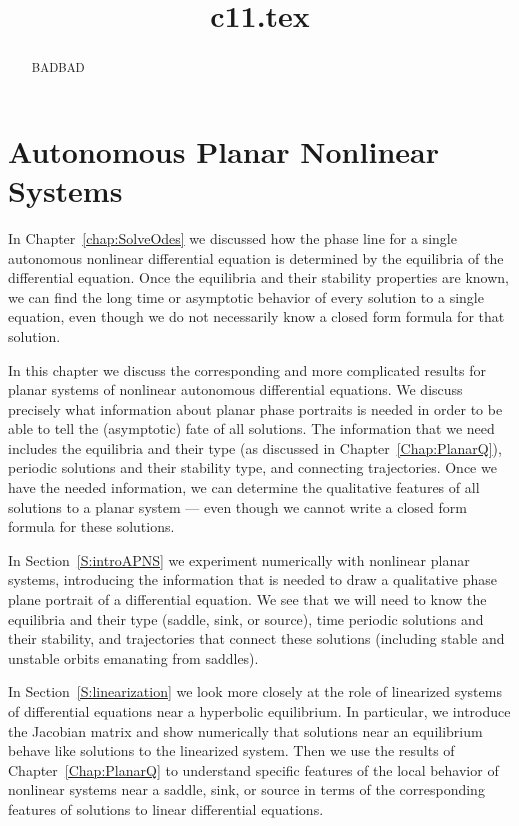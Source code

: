 \documentclass{ximera}
\title{c11.tex}
\begin{document}
\begin{abstract}
BADBAD
\end{abstract}
\maketitle

\chapter{Autonomous Planar Nonlinear Systems}
\label{C:NPS}

\normalsize

In Chapter~\ref{chap:SolveOdes} we discussed how the phase line for a single
autonomous nonlinear differential equation is determined by the equilibria of 
the differential equation.  Once the equilibria and their stability properties
are known, we can find the long time or asymptotic behavior of every solution 
to a single equation, even though we do not necessarily know a closed form 
formula for that solution.  

In this chapter we discuss the corresponding and more complicated results for 
planar systems of nonlinear autonomous differential equations.  We discuss 
precisely what information about planar phase portraits is needed in order to 
be able to tell the (asymptotic) fate of all solutions.  The information that 
we need includes the equilibria and their type (as discussed in 
Chapter~\ref{Chap:PlanarQ}), periodic solutions and their stability type, and
connecting trajectories.  Once we have the needed information, we can 
determine the qualitative features of all solutions to a planar system --- 
even though we cannot write a closed form formula for these solutions.  

In Section~\ref{S:introAPNS} we experiment numerically with nonlinear planar 
systems, introducing the information that is needed to draw a qualitative 
phase plane portrait of a differential equation.  We see that we will need to 
know the equilibria and their type (saddle, sink, or source), time periodic 
solutions and their stability, and trajectories that connect these solutions 
(including stable and unstable orbits emanating from saddles).  

In Section~\ref{S:linearization} we look more closely at the role of
linearized systems of differential equations near a hyperbolic equilibrium. 
In particular, we introduce the Jacobian matrix and show numerically that 
solutions near an equilibrium behave like solutions to the linearized 
system.  Then we use the results of Chapter~\ref{Chap:PlanarQ} to understand
specific features of the local behavior of nonlinear systems near a saddle,
sink, or source in terms of the corresponding features of solutions to linear 
differential equations.
\end{document}
